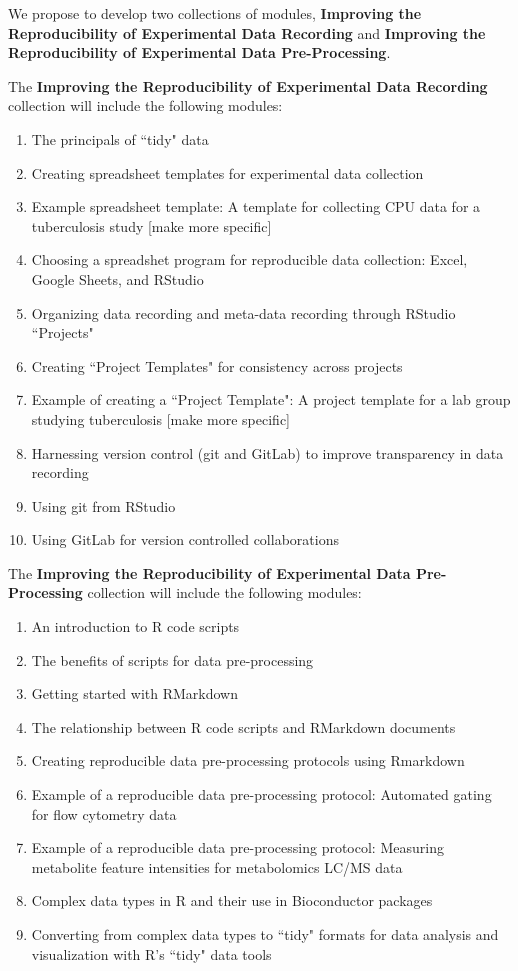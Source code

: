 \documentclass[pdftex,english,12pt,parskip=half]{scrartcl}
\begin{document}
We propose to develop two collections of modules, \textbf{Improving the Reproducibility of Experimental Data Recording} and \textbf{Improving the Reproducibility of Experimental Data Pre-Processing}. 

The \textbf{Improving the Reproducibility of Experimental Data Recording} collection will include the following modules:

\begin{enumerate}
\item The principals of ``tidy" data
\item Creating spreadsheet templates for experimental data collection
\item Example spreadsheet template: A template for collecting CPU data for a tuberculosis study [make more specific]
\item Choosing a spreadshet program for reproducible data collection: Excel, Google Sheets, and RStudio 
\item Organizing data recording and meta-data recording through RStudio ``Projects"  
\item Creating ``Project Templates" for consistency across projects
\item Example of creating a ``Project Template": A project template for a lab group studying tuberculosis [make more specific]
\item Harnessing version control (git and GitLab) to improve transparency in data recording
\item Using git from RStudio
\item Using GitLab for version controlled collaborations
\end{enumerate}

The \textbf{Improving the Reproducibility of Experimental Data Pre-Processing} collection will include the following modules:

\begin{enumerate}
\item An introduction to R code scripts
\item The benefits of scripts for data pre-processing
\item Getting started with RMarkdown 
\item The relationship between R code scripts and RMarkdown documents
\item Creating reproducible data pre-processing protocols using Rmarkdown
\item Example of a reproducible data pre-processing protocol: Automated gating for flow cytometry data
\item Example of a reproducible data pre-processing protocol: Measuring metabolite feature intensities for metabolomics LC/MS data
\item Complex data types in R and their use in Bioconductor packages
\item Converting from complex data types to ``tidy" formats for data analysis and visualization with R's ``tidy" data tools
\end{enumerate}
\end{document}
